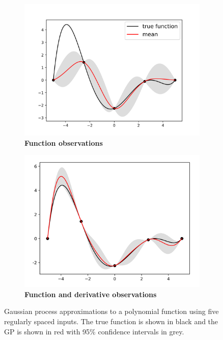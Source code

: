 \documentclass{article}
\begin{document}
\begin{figure}
		\centering
		\captionsetup{justification=centering}
    \begin{subfigure}[b]{.5\textwidth}
      \centering
      \includegraphics[scale=0.38]{figures/smooth-noder.png}
      \caption{\textbf{Function observations}}
    \end{subfigure}%
    \begin{subfigure}[b]{.5\textwidth}
      \centering
      \includegraphics[scale=1.2]{figures/smooth-der.png}
      \caption{\textbf{Function and derivative observations}}
    \end{subfigure}
		\caption{Gaussian process approximations to a polynomial function using five regularly spaced inputs. The true function is shown in black and the GP is shown in red with 95\% confidence intervals in grey.}
		\label{smooth}
\end{figure}
\end{document}
